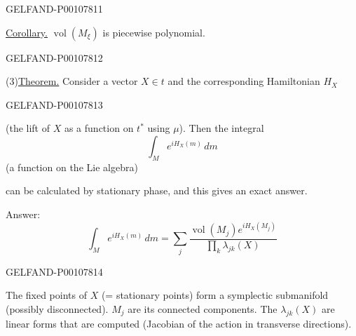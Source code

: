 \begin{GelfandAdjacentEvidence}{GELFAND-P001078}{11}


\uline{Corollary.} $\operatorname{vol}(M_\xi)$ is piecewise polynomial.
\end{GelfandAdjacentEvidence}
\begin{GelfandAdjacentEvidence}{GELFAND-P001078}{12}


(3)\quad\uline{Theorem.} Consider a vector $X\in t$ and the corresponding Hamiltonian $H_X$
\end{GelfandAdjacentEvidence}
\begin{GelfandAdjacentEvidence}{GELFAND-P001078}{13}

(the lift of $X$ as a function on $t^*$ using $\mu$). Then the integral
\begin{equation*}
\int_M e^{iH_X(m)}\,dm
\tag{4}
\end{equation*}
(a function on the Lie algebra)

can be calculated by stationary phase, and this gives an exact answer.

Answer:
\begin{equation*}
\int_M e^{iH_X(m)}\,dm
=\sum_j\frac{\operatorname{vol}(M_j)e^{iH_X(M_j)}}
{\prod_k\lambda_{jk}(X)}
\tag{5}
\end{equation*}
\end{GelfandAdjacentEvidence}
\begin{GelfandAdjacentEvidence}{GELFAND-P001078}{14}


The fixed points of $X$ (= stationary points) form a symplectic submanifold (possibly disconnected).
$M_j$ are its connected components. The $\lambda_{jk}(X)$ are linear forms that are computed
(Jacobian of the action in transverse directions).
\end{GelfandAdjacentEvidence}



